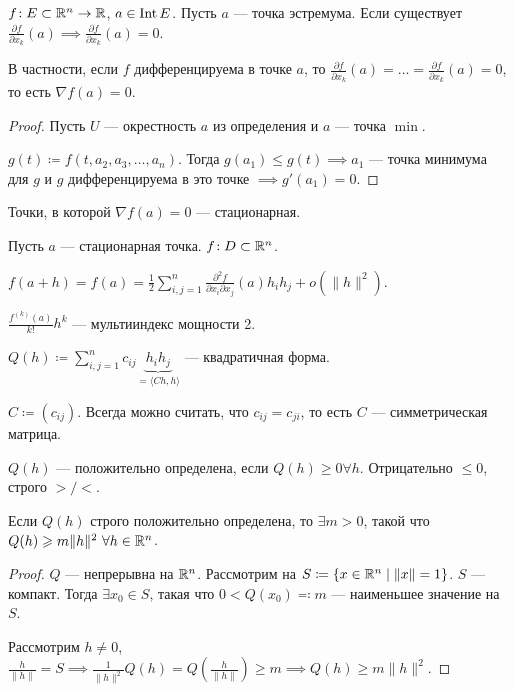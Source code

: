 \begin{theorem}
    $f\!: E \subset \mathbb{R}^n \to \mathbb{R}$,  $a \in \operatorname{Int} E$. Пусть  $a$ --- точка эстремума. Если существует  $\frac{\partial f}{\partial x_k}(a) \implies \frac{\partial f}{\partial x_k}(a) = 0$.

    В частности, если $f$ дифференцируема в точке  $a$, то  $\frac{\partial f}{\partial x_k}(a) = \ldots = \frac{\partial f}{\partial x_k}(a) = 0$, то есть $\nabla f(a) = 0$.
\end{theorem}
\begin{proof}
    Пусть $U$ --- окрестность  $a$ из определения и  $a$ --- точка  $\min$.

     $g(t) \coloneqq f(t, a_2, a_3, \ldots, a_n)$. Тогда $g(a_1) \le g(t) \implies a_1$ --- точка минимума для $g$ и  $g$ дифференцируема в это точке  $\implies g'(a_1) = 0$.
\end{proof}
\begin{definition}
    Точки, в которой $\nabla f(a) = 0$ --- стационарная.
\end{definition}
\begin{remark}
    Пусть $a$ --- стационарная точка.  $f\!: D \subset \mathbb{R}^n$.

    $f(a+h) = f(a) = \frac{1}{2} \sum\limits_{i, j = 1}^n \frac{\partial^2 f}{\partial x_i \partial x_j}(a) h_i h_j + o(\|h\|^2)$.

    $\frac{f^{(k)}(a)}{k!}h^k$ --- мультииндекс мощности 2.
\end{remark}
\begin{definition}
    $Q(h) \coloneqq \sum\limits_{i, j = 1}^n c_{ij} \underbrace{h_ih_j}_{=\langle Ch, h\rangle}$ --- квадратичная форма.

    $C \coloneqq (c_{ij})$. Всегда можно считать, что $c_{ij} = c_{ji}$, то есть  $C$ --- симметрическая матрица.
\end{definition}
\begin{definition}
    $Q(h)$ --- положительно определена, если  $Q(h) \ge 0 \forall h$.
    Отрицательно $\le 0$, строго $>/<$.
\end{definition}
\begin{theorem}
    Если $Q(h)$ строго положительно определена, то  $\exists m > 0$, такой что  $Q(h) \geqslant m \|h\|^2\ \forall h \in \mathbb{R}^n$.
\end{theorem}
\begin{proof}
    $Q$ --- непрерывна на $\mathbb{R}^n$. Рассмотрим на   $S\coloneqq \{x \in \mathbb{R}^n \mid \|x\|=1\}$.  $S$ --- компакт. Тогда  $\exists x_0 \in S$, такая что $0 < Q(x_0) \eqqcolon m$ --- наименьшее значение на  $S$.

    Рассмотрим  $h \neq 0$, $\frac{h}{\|h\|} = S \implies \frac{1}{\|h\|^2}Q(h) =  Q(\frac{h}{\|h\|}) \ge m \implies Q(h) \ge m\|h\|^2$.
\end{proof}
